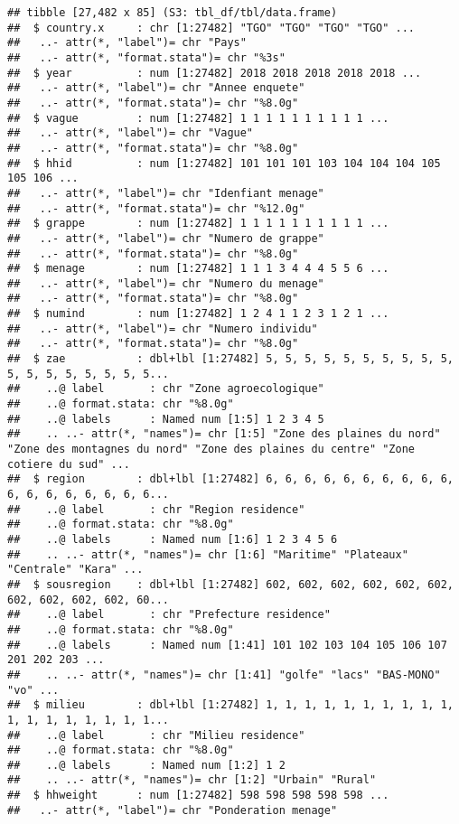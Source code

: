 \documentclass[
]{article}
\begin{document}
\begin{verbatim}
## tibble [27,482 x 85] (S3: tbl_df/tbl/data.frame)
##  $ country.x     : chr [1:27482] "TGO" "TGO" "TGO" "TGO" ...
##   ..- attr(*, "label")= chr "Pays"
##   ..- attr(*, "format.stata")= chr "%3s"
##  $ year          : num [1:27482] 2018 2018 2018 2018 2018 ...
##   ..- attr(*, "label")= chr "Annee enquete"
##   ..- attr(*, "format.stata")= chr "%8.0g"
##  $ vague         : num [1:27482] 1 1 1 1 1 1 1 1 1 1 ...
##   ..- attr(*, "label")= chr "Vague"
##   ..- attr(*, "format.stata")= chr "%8.0g"
##  $ hhid          : num [1:27482] 101 101 101 103 104 104 104 105 105 106 ...
##   ..- attr(*, "label")= chr "Idenfiant menage"
##   ..- attr(*, "format.stata")= chr "%12.0g"
##  $ grappe        : num [1:27482] 1 1 1 1 1 1 1 1 1 1 ...
##   ..- attr(*, "label")= chr "Numero de grappe"
##   ..- attr(*, "format.stata")= chr "%8.0g"
##  $ menage        : num [1:27482] 1 1 1 3 4 4 4 5 5 6 ...
##   ..- attr(*, "label")= chr "Numero du menage"
##   ..- attr(*, "format.stata")= chr "%8.0g"
##  $ numind        : num [1:27482] 1 2 4 1 1 2 3 1 2 1 ...
##   ..- attr(*, "label")= chr "Numero individu"
##   ..- attr(*, "format.stata")= chr "%8.0g"
##  $ zae           : dbl+lbl [1:27482] 5, 5, 5, 5, 5, 5, 5, 5, 5, 5, 5, 5, 5, 5, 5, 5, 5, 5...
##    ..@ label       : chr "Zone agroecologique"
##    ..@ format.stata: chr "%8.0g"
##    ..@ labels      : Named num [1:5] 1 2 3 4 5
##    .. ..- attr(*, "names")= chr [1:5] "Zone des plaines du nord" "Zone des montagnes du nord" "Zone des plaines du centre" "Zone cotiere du sud" ...
##  $ region        : dbl+lbl [1:27482] 6, 6, 6, 6, 6, 6, 6, 6, 6, 6, 6, 6, 6, 6, 6, 6, 6, 6...
##    ..@ label       : chr "Region residence"
##    ..@ format.stata: chr "%8.0g"
##    ..@ labels      : Named num [1:6] 1 2 3 4 5 6
##    .. ..- attr(*, "names")= chr [1:6] "Maritime" "Plateaux" "Centrale" "Kara" ...
##  $ sousregion    : dbl+lbl [1:27482] 602, 602, 602, 602, 602, 602, 602, 602, 602, 602, 60...
##    ..@ label       : chr "Prefecture residence"
##    ..@ format.stata: chr "%8.0g"
##    ..@ labels      : Named num [1:41] 101 102 103 104 105 106 107 201 202 203 ...
##    .. ..- attr(*, "names")= chr [1:41] "golfe" "lacs" "BAS-MONO" "vo" ...
##  $ milieu        : dbl+lbl [1:27482] 1, 1, 1, 1, 1, 1, 1, 1, 1, 1, 1, 1, 1, 1, 1, 1, 1, 1...
##    ..@ label       : chr "Milieu residence"
##    ..@ format.stata: chr "%8.0g"
##    ..@ labels      : Named num [1:2] 1 2
##    .. ..- attr(*, "names")= chr [1:2] "Urbain" "Rural"
##  $ hhweight      : num [1:27482] 598 598 598 598 598 ...
##   ..- attr(*, "label")= chr "Ponderation menage"

\end{verbatim}
\end{document}
